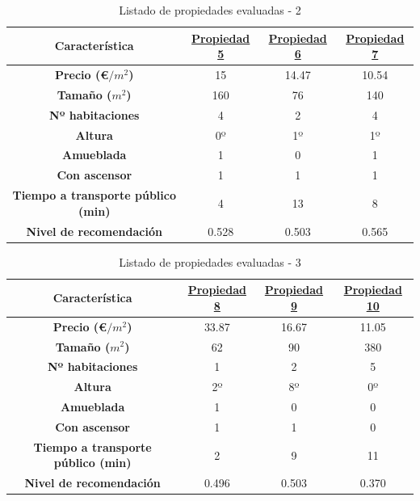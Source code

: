 \documentclass[12pt]{report} %
\begin{document}
    \begin{table}[h]
        \center
        \begin{tabular}{|c|ccc|}
            \hline
            \textbf{Característica} & \href{https://www.idealista.com/inmueble/106137531/}{Propiedad 5} & \href{https://www.idealista.com/inmueble/106355273/}{Propiedad 6} & \href{https://www.idealista.com/inmueble/106107441/}{Propiedad 7} \\
            \hline
            \hline
            \textbf{Precio (€$/m^2$)}                  & 15    & 14.47 & 10.54 \\
            \textbf{Tamaño ($m^2$)}                    & 160   & 76    & 140   \\
            \textbf{Nº habitaciones}                   & 4     & 2     & 4     \\
            \textbf{Altura}                            & 0º    & 1º    & 1º    \\
            \textbf{Amueblada\footnotemark[1]}         & 1     & 0     & 1     \\
            \textbf{Con ascensor\footnotemark[1]}      & 1     & 1     & 1     \\
            \textbf{Tiempo a transporte público (min)} & 4     & 13    & 8     \\
            \textbf{Nivel de recomendación}            & 0.528 & 0.503 & 0.565 \\
            \hline
        \end{tabular}
        \caption{Listado de propiedades evaluadas - 2}
    \end{table}
    \begin{table}[h]
        \center
        \begin{tabular}{|c|ccc|}
            \hline
            \textbf{Característica} & \href{https://www.idealista.com/inmueble/102581910/}{Propiedad 8} & \href{https://www.idealista.com/inmueble/96374938/}{Propiedad 9} & \href{https://www.idealista.com/inmueble/105316199/}{Propiedad 10} \\
            \hline
            \hline
            \textbf{Precio (€$/m^2$)}                  & 33.87 & 16.67 & 11.05 \\
            \textbf{Tamaño ($m^2$)}                    & 62    & 90    & 380   \\
            \textbf{Nº habitaciones}                   & 1     & 2     & 5     \\
            \textbf{Altura}                            & 2º    & 8º    & 0º    \\
            \textbf{Amueblada\footnotemark[1]}         & 1     & 0     & 0     \\
            \textbf{Con ascensor\footnotemark[1]}      & 1     & 1     & 0     \\
            \textbf{Tiempo a transporte público (min)} & 2     & 9     & 11    \\
            \textbf{Nivel de recomendación}            & 0.496 & 0.503 & 0.370 \\
            \hline
        \end{tabular}
        \caption{Listado de propiedades evaluadas - 3}
    \end{table}
\end{document}
